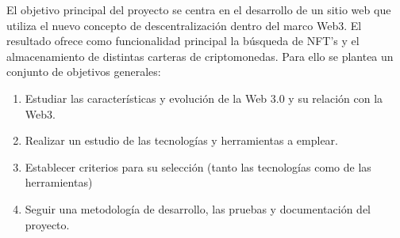 El objetivo principal del proyecto se centra en el desarrollo de un sitio web 
que utiliza el nuevo concepto de descentralización dentro del marco Web3. 
El resultado ofrece como funcionalidad principal la búsqueda de NFT’s y el 
almacenamiento de distintas carteras de criptomonedas. Para ello se plantea 
un conjunto de objetivos generales:
\begin{enumerate}
    \item Estudiar las características y evolución de la Web 3.0 y su relación con la Web3.
    \item Realizar un estudio de las tecnologías y herramientas a emplear.
    \item Establecer criterios para su selección (tanto las tecnologías como de las herramientas)
    \item Seguir una metodología de desarrollo, las pruebas y documentación del proyecto.
\end{enumerate}


